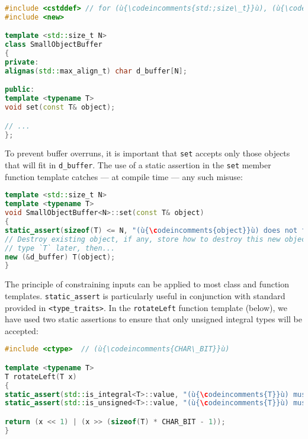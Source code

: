%
%
\begin{lstlisting}[language=C++]
#include <cstddef> // for (ù{\codeincomments{std:;size\_t}}ù), (ù{\codeincomments{std::max\_align\_t}}ù)
#include <new>

template <std::size_t N>
class SmallObjectBuffer
{
private:
alignas(std::max_align_t) char d_buffer[N];

public:
template <typename T>
void set(const T& object);

// ...
};
\end{lstlisting}


\noindent To prevent buffer overruns, it is important that \lstinline!set! accepts
only those objects that will fit in \lstinline!d_buffer!. The use of a
static assertion in the \lstinline!set! member function template catches
--- at compile time --- any such misuse:

\begin{lstlisting}[language=C++]
template <std::size_t N>
template <typename T>
void SmallObjectBuffer<N>::set(const T& object)
{
static_assert(sizeof(T) <= N, "(ù{\codeincomments{object}}ù) does not fit in the small buffer.");
// Destroy existing object, if any, store how to destroy this new object of
// type `T` later, then...
new (&d_buffer) T(object);
}
\end{lstlisting}



The principle of constraining inputs can be applied to most class and
function templates. \lstinline!static_assert! is particularly useful in
conjunction with standard  provided in
\lstinline!<type_traits>!. In the \lstinline!rotateLeft! function template
(below), we have used two static assertions to ensure that only unsigned
integral types will be accepted:

\begin{lstlisting}[language=C++]
#include <ctype>  // (ù{\codeincomments{CHAR\_BIT}}ù)

template <typename T>
T rotateLeft(T x)
{
static_assert(std::is_integral<T>::value, "(ù{\codeincomments{T}}ù) must be an integral type.");
static_assert(std::is_unsigned<T>::value, "(ù{\codeincomments{T}}ù) must be an unsigned type.");

return (x << 1) | (x >> (sizeof(T) * CHAR_BIT - 1));
}
\end{lstlisting}


